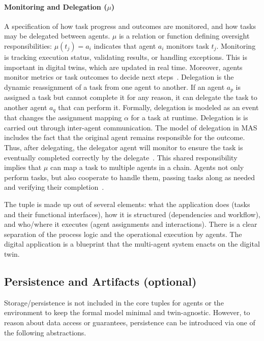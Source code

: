 \paragraph{Monitoring and Delegation ($\mu$)} A specification of how task progress and outcomes are monitored, and how tasks may be delegated between agents. $\mu$ is a relation or function defining oversight responsibilities: $\mu(t_j) = a_i$ indicates that agent $a_i$ monitors task $t_j$. Monitoring is tracking execution status, validating results, or handling exceptions. This is  important in digital twins, which are updated in real time. Moreover, agents monitor metrics or task outcomes to decide next steps~\cite{Lee2025DigitalTwins}. Delegation is the dynamic reassignment of a task from one agent to another. If an agent $a_p$ is assigned a task but cannot complete it for any reason, it can delegate the task to another agent $a_q$ that can perform it. Formally, delegation is modeled as an event that changes the assignment mapping $\alpha$ for a task at runtime. Delegation is is carried out through inter-agent communication. The model of delegation in MAS includes the fact that the original agent remains responsible for the outcome. Thus, after delegating, the delegator agent will monitor to ensure the task is eventually completed correctly by the delegate~\cite{NormanReed2002}. This shared responsibility implies that $\mu$ can map a task to multiple agents in a chain. Agents not only perform tasks, but also cooperate to handle them, passing tasks along as needed and verifying their completion~\cite{NormanReed2002}.


The tuple is made up out of several elements: what the application does (tasks and their functional interfaces), how it is structured (dependencies and workflow), and who/where it executes (agent assignments and interactions). There is a clear separation of the process logic and the operational execution by agents. The digital application is a blueprint that the multi-agent system enacts on the digital twin.

\subsection{Persistence and Artifacts (optional)}

Storage/persistence is not included in the core tuples for agents or the environment to keep the formal model minimal and twin-agnostic. However, to reason about data access or guarantees, persistence can be introduced via one of the following abstractions.

